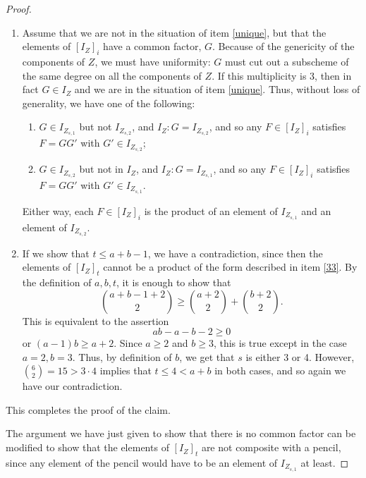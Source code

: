 \documentclass[12pt]{amsart}%
\numberwithin{equation}{section}
\theoremstyle{definition}
\numberwithin{equation}{section}
\begin{document}
\begin{proof}
\begin{enumerate}
\item \label{33} Assume that we are not in the situation of item \ref{unique}, but that the elements of $[I_Z]_i$ have a common factor, $G$. Because of the genericity of the components of $Z$, we must have uniformity: $G$ must cut out a subscheme of the same degree on all the components of $Z$. If this multiplicity is 3, then in fact $G \in I_Z$ and we are in the situation of  item \ref{unique}. Thus, without loss of generality, we have one of the following:
\vspace{.1in}

\begin{enumerate}
    \item $G \in I_{Z_{s,1}}$ but not $I_{Z_{s,2}}$, and $I_Z : G =I_{Z_{s,2}}$, and so any $F \in [I_Z]_i$ satisfies $F = GG'$ with $G' \in I_{Z_{s,2}}$;

    \vspace{.1in}

    \item $G \in I_{Z_{s,2}}$ but not in $I_Z$, and $I_Z : G = I_{Z_{s,1}}$, and so any $F \in [I_Z]_i$ satisfies $F = GG'$ with $G' \in I_{Z_{s,1}}$.
\end{enumerate}


\noindent Either way, each $F \in [I_Z]_i$ is the product of an element of $I_{Z_{s,1}}$ and an element of $I_{Z_{s,2}}$.

\item If we show that $t \leq a+b-1$, we have a contradiction, since then the elements of $[I_Z]_t$ cannot be a product of the form described in item \ref{33}. By the definition of $a, b, t$,  it is enough to show that 
\[
\binom{a+b-1 +2}{2} \ge  \binom{a+2}{2} + \binom{b+2}{2}.
\]
This is equivalent to the assertion
\[
ab - a - b - 2 \geq 0
\]
or $(a-1) b \ge a+2$.
Since $a \ge 2$ and $b \ge 3$, this is true except in the case $a=2, b=3$. Thus, by definition of $b$, we get that $s$ is either 3 or 4. However, $\binom{6}{2} = 15 > 3 \cdot 4$ implies that $t \leq 4 < a+b$ in both cases, and so again we have our contradiction.


\end{enumerate}

\noindent This completes the proof of the claim.

The argument we have just given to show that there is no common factor can be modified to show that the elements of $[I_Z]_t$ are not composite with a pencil, since any element of the pencil would have to be an element of $I_{Z_{s,1}}$ at least.


\end{proof}
\end{document}
